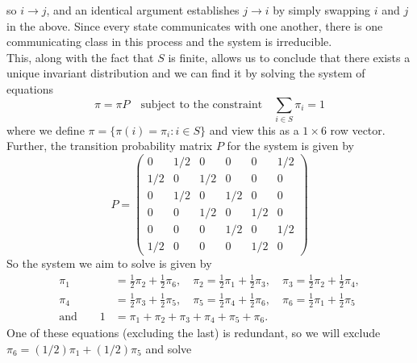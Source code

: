 \documentclass[11pt, letterpaper]{article}
\begin{document}
    so $i\longrightarrow j$, and an identical argument establishes $j\longrightarrow i$ by simply swapping $i$ and $j$ in the above.
    Since every state communicates with one another, there is one communicating class in this process and the system is irreducible.\\[10pt]
    This, along with the fact that $S$ is finite, allows us to conclude that there exists a unique invariant distribution and we can find it by solving
    the system of equations
    \[\pi=\pi P\quad\text{subject to the constraint}\quad \sum_{i\in S}\pi_i=1\]
    where we define $\pi=\{\pi(i)=\pi_i:i\in S\}$ and view this as a $1\times 6$ row vector. Further, the transition probability matrix $P$ for the system is given by
    \[P=\begin{pmatrix}
       0 & 1/2 & 0 & 0 & 0 & 1/2\\
       1/2 & 0 & 1/2 & 0 & 0 & 0\\
       0 & 1/2 & 0 & 1/2 & 0 & 0\\
       0 & 0 & 1/2 & 0 & 1/2 & 0\\
       0 & 0 & 0 & 1/2 & 0 & 1/2\\
       1/2 & 0 & 0 & 0 & 1/2 & 0 
    \end{pmatrix}\]
    So the system we aim to solve is given by
    \begin{align*}
        \pi_1 &= \frac{1}{2}\pi_2 + \frac{1}{2}\pi_6,\quad
        \pi_2 = \frac{1}{2}\pi_1 + \frac{1}{2}\pi_3,\quad
        \pi_3 = \frac{1}{2}\pi_2 + \frac{1}{2}\pi_4,\\
        \pi_4 &= \frac{1}{2}\pi_3 + \frac{1}{2}\pi_5,\quad
        \pi_5 = \frac{1}{2}\pi_4 + \frac{1}{2}\pi_6,\quad
        \pi_6 = \frac{1}{2}\pi_1 + \frac{1}{2}\pi_5\\
        \text{and}\qquad 1&=\pi_1+\pi_2+\pi_3+\pi_4+\pi_5+\pi_6.
    \end{align*}
    One of these equations (excluding the last) is redundant, so we will exclude $\pi_6=(1/2)\pi_1+(1/2)\pi_5$ and solve
\end{document}
